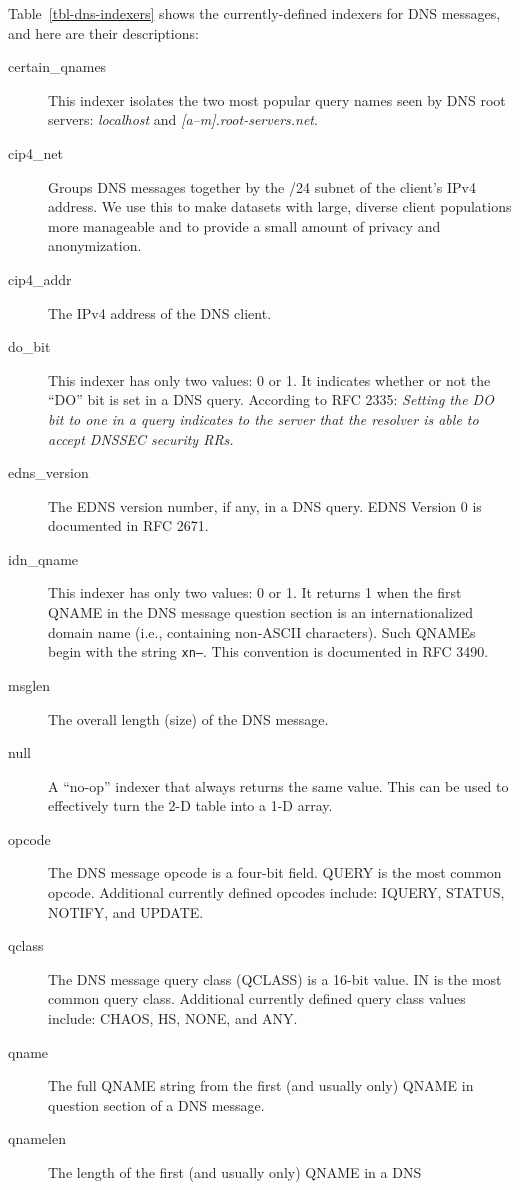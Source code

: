 \documentclass{report}
\begin{document}
Table~\ref{tbl-dns-indexers} shows the currently-defined indexers
for DNS messages, and here are their descriptions:

\begin{description}
\item[certain\_qnames]
	This indexer isolates the two most popular query names seen
	by DNS root servers: {\em localhost\/} and {\em
	[a--m].root-servers.net\/}.
\item[cip4\_net]
	Groups DNS messages together by the /24 subnet of the
	client's IPv4 address.  We use this to make datasets with
	large, diverse client populations more manageable and to
	provide a small amount of privacy and anonymization.
\item[cip4\_addr]
	The IPv4 address of the DNS client.
\item[do\_bit]
	This indexer has only two values: 0 or 1.  It indicates
	whether or not the ``DO'' bit is set in a DNS query.  According to
	RFC 2335: {\em Setting the DO bit to one in a query indicates
	to the server that the resolver is able to accept DNSSEC
	security RRs.}
\item[edns\_version]
	The EDNS version number, if any, in a DNS query.  EDNS
	Version 0 is documented in RFC 2671.
\item[idn\_qname]
	This indexer has only two values: 0 or 1.  It returns 1
	when the first QNAME in the DNS message question section
	is an internationalized domain name (i.e., containing
	non-ASCII characters).  Such QNAMEs begin with the string
	{\tt xn--\/}.  This convention is documented in RFC 3490.
\item[msglen]
	The overall length (size) of the DNS message.
\item[null]
	A ``no-op'' indexer that always returns the same value.
	This can be used to effectively turn the 2-D table into a
	1-D array.
\item[opcode]
	The DNS message opcode is a four-bit field.  QUERY is the
	most common opcode.  Additional currently defined opcodes
	include: IQUERY, STATUS, NOTIFY, and UPDATE.
\item[qclass]
	The DNS message query class (QCLASS) is a 16-bit value.  IN
	is the most common query class.  Additional currently defined
	query class values include: CHAOS, HS, NONE, and ANY.
\item[qname]
	The full QNAME string from the first (and usually only)
	QNAME in question section of a DNS message.
\item[qnamelen]
	The length of the first (and usually only) QNAME in a DNS

\end{description}
\end{document}
